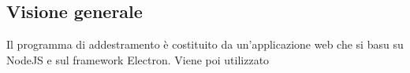 \documentclass[../manuale-sviluppatore.tex]{subfiles}
\begin{document}
\subsection{Visione generale}%
\label{subs:installazione_applicazione_di_addestramento}
    Il programma di addestramento è costituito da un'applicazione web che si basu su NodeJS e sul framework Electron. Viene poi utilizzato 
\end{document}
